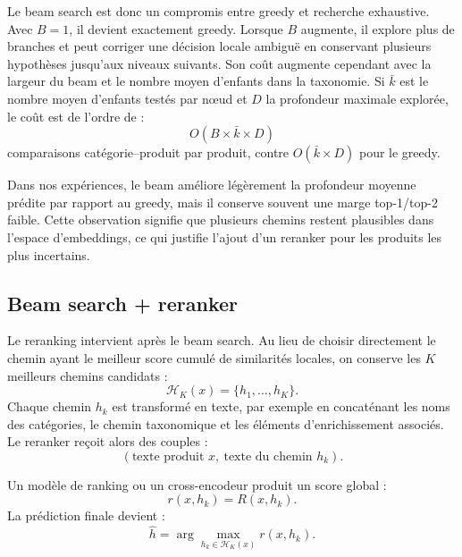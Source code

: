 \documentclass[12pt,a4paper]{report}
\begin{document}
Le beam search est donc un compromis entre greedy et recherche exhaustive. Avec $B=1$, il devient exactement greedy. Lorsque $B$ augmente, il explore plus de branches et peut corriger une décision locale ambiguë en conservant plusieurs hypothèses jusqu'aux niveaux suivants. Son coût augmente cependant avec la largeur du beam et le nombre moyen d'enfants dans la taxonomie. Si $\bar{k}$ est le nombre moyen d'enfants testés par nœud et $D$ la profondeur maximale explorée, le coût est de l'ordre de :
\begin{equation}
    O(B \times \bar{k} \times D)
\end{equation}
comparaisons catégorie--produit par produit, contre $O(\bar{k} \times D)$ pour le greedy.

Dans nos expériences, le beam améliore légèrement la profondeur moyenne prédite par rapport au greedy, mais il conserve souvent une marge top-1/top-2 faible. Cette observation signifie que plusieurs chemins restent plausibles dans l'espace d'embeddings, ce qui justifie l'ajout d'un reranker pour les produits les plus incertains.

\subsection*{Beam search + reranker}

Le reranking intervient après le beam search. Au lieu de choisir directement le chemin ayant le meilleur score cumulé de similarités locales, on conserve les $K$ meilleurs chemins candidats :
\begin{equation}
    \mathcal{H}_K(x)
    =
    \{h_1,\ldots,h_K\}.
\end{equation}
Chaque chemin $h_k$ est transformé en texte, par exemple en concaténant les noms des catégories, le chemin taxonomique et les éléments d'enrichissement associés. Le reranker reçoit alors des couples :
\begin{equation}
    \left(\text{texte produit } x,\ \text{texte du chemin } h_k\right).
\end{equation}

Un modèle de ranking ou un cross-encodeur produit un score global :
\begin{equation}
    r(x,h_k)
    =
    R\left(x,h_k\right).
\end{equation}
La prédiction finale devient :
\begin{equation}
    \hat{h}
    =
    \arg\max_{h_k \in \mathcal{H}_K(x)}
    r(x,h_k).
\end{equation}
\end{document}
